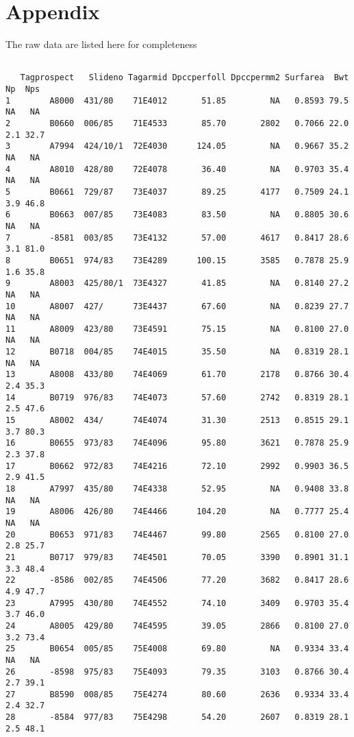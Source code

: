 \documentclass[titlepage]{article}  %
\begin{document}
\section{Appendix}
The raw data are listed here for completeness
\begin{verbatim}

   Tagprospect   Slideno Tagarmid Dpccperfoll Dpccpermm2 Surfarea  Bwt  Np  Nps
1        A8000  431/80    71E4012       51.85         NA   0.8593 79.5  NA   NA
2        B0660  006/85    71E4533       85.70       2802   0.7066 22.0 2.1 32.7
3        A7994  424/10/1  72E4030      124.05         NA   0.9667 35.2  NA   NA
4        A8010  428/80    72E4078       36.40         NA   0.9703 35.4  NA   NA
5        B0661  729/87    73E4037       89.25       4177   0.7509 24.1 3.9 46.8
6        B0663  007/85    73E4083       83.50         NA   0.8805 30.6  NA   NA
7        -8581  003/85    73E4132       57.00       4617   0.8417 28.6 3.1 81.0
8        B0651  974/83    73E4289      100.15       3585   0.7878 25.9 1.6 35.8
9        A8003  425/80/1  73E4327       41.85         NA   0.8140 27.2  NA   NA
10       A8007  427/      73E4437       67.60         NA   0.8239 27.7  NA   NA
11       A8009  423/80    73E4591       75.15         NA   0.8100 27.0  NA   NA
12       B0718  004/85    74E4015       35.50         NA   0.8319 28.1  NA   NA
13       A8008  433/80    74E4069       61.70       2178   0.8766 30.4 2.4 35.3
14       B0719  976/83    74E4073       57.60       2742   0.8319 28.1 2.5 47.6
15       A8002  434/      74E4074       31.30       2513   0.8515 29.1 3.7 80.3
16       B0655  973/83    74E4096       95.80       3621   0.7878 25.9 2.3 37.8
17       B0662  972/83    74E4216       72.10       2992   0.9903 36.5 2.9 41.5
18       A7997  435/80    74E4338       52.95         NA   0.9408 33.8  NA   NA
19       A8006  426/80    74E4466      104.20         NA   0.7777 25.4  NA   NA
20       B0653  971/83    74E4467       99.80       2565   0.8100 27.0 2.8 25.7
21       B0717  979/83    74E4501       70.05       3390   0.8901 31.1 3.3 48.4
22       -8586  002/85    74E4506       77.20       3682   0.8417 28.6 4.9 47.7
23       A7995  430/80    74E4552       74.10       3409   0.9703 35.4 3.7 46.0
24       A8005  429/80    74E4595       39.05       2866   0.8100 27.0 3.2 73.4
25       B0654  005/85    75E4008       69.80         NA   0.9334 33.4  NA   NA
26       -8598  975/83    75E4093       79.35       3103   0.8766 30.4 2.7 39.1
27       B8590  008/85    75E4274       80.60       2636   0.9334 33.4 2.4 32.7
28       -8584  977/83    75E4298       54.20       2607   0.8319 28.1 2.5 48.1

\end{verbatim}
\end{document}
